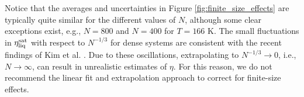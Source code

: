 \documentclass[preprint,review,12pt]{elsarticle}
\begin{document}
	
	Notice that the averages and uncertainties in Figure \ref{fig:finite_size_effects} are typically quite similar for the different values of $N$, although some clear exceptions exist, e.g., $N = 800$ and $N=400$ for $T = 166$ K. The small fluctuations in $\eta_{\rm liq}^{\rm sat}$ with respect to $N^{-1/3}$ for dense systems are consistent with the recent findings of Kim et al. \cite{Kim2018}. Due to these oscillations, extrapolating to $N^{-1/3} \rightarrow 0$, i.e., $N \rightarrow \infty$, can result in unrealistic estimates of $\eta$. For this reason, we do not recommend the linear fit and extrapolation approach to correct for finite-size effects. 
	
	
	
	
	
\end{document}
